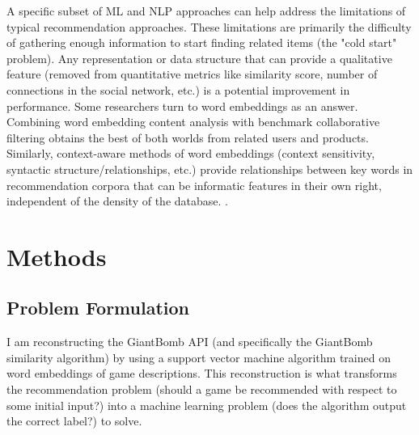 \documentclass[10pt,twocolumn]{article}
\begin{document}
A specific subset of ML and NLP approaches can help address the limitations of typical recommendation approaches. These limitations are primarily the difficulty of gathering enough information to start finding related items (the "cold start" problem). Any representation or data structure that can provide a qualitative feature (removed from quantitative metrics like similarity score, number of connections in the social network, etc.) is a potential improvement in performance. Some researchers turn to word embeddings as an answer. Combining word embedding content analysis with benchmark collaborative filtering obtains the best of both worlds from related users and products. \cite{LNguyen} Similarly, context-aware methods of word embeddings (context sensitivity, syntactic structure/relationships, etc.) provide relationships between key words in recommendation corpora that can be informatic features in their own right, independent of the density of the database. \cite{CSundermann, Ramzan}.

\section{Methods}



\subsection{Problem Formulation}

I am reconstructing the GiantBomb API \cite{GiantBomb} (and specifically the GiantBomb similarity algorithm) by using a support vector machine algorithm trained on word embeddings of game descriptions. This reconstruction is what transforms the recommendation problem (should a game be recommended with respect to some initial input?) into a machine learning problem (does the algorithm output the correct label?) to solve.
\end{document}
